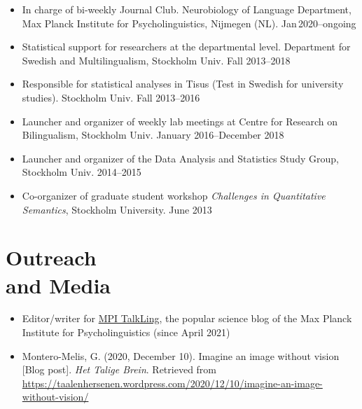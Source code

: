 \documentclass[margin, 11pt]{res} %
\begin{document}
\begin{resume}
\begin{itemize}

\item In charge of bi-weekly Journal Club. Neurobiology of Language Department, Max Planck Institute for Psycholinguistics, Nijmegen (NL). Jan\,2020--ongoing

\item Statistical support for researchers at the departmental level. Department for Swedish and Multilingualism, Stockholm Univ.
Fall 2013--2018

\item Responsible for statistical analyses in Tisus (Test in Swedish for university studies). Stockholm Univ. Fall 2013--2016

\item Launcher and organizer of weekly lab meetings at Centre for Research on Bilingualism, Stockholm Univ. January 2016--December 2018

\item Launcher and organizer of the Data Analysis and Statistics Study Group, Stockholm Univ. 2014--2015

\item Co-organizer of graduate student workshop \emph{Challenges in Quantitative Semantics}, Stockholm University. June 2013

\end{itemize}



\section{\sc Outreach \\and Media}

\begin{itemize}

\item Editor/writer for \href{https://www.mpi-talkling.mpi.nl/}{MPI TalkLing}, the popular science blog of the Max Planck Institute for Psycholinguistics (since April 2021)

\item Montero-Melis, G. (2020, December 10). Imagine an image without vision [Blog post]. \emph{Het Talige Brein}. Retrieved from \url{https://taalenhersenen.wordpress.com/2020/12/10/imagine-an-image-without-vision/}


\end{itemize}
\end{resume}
\end{document}
